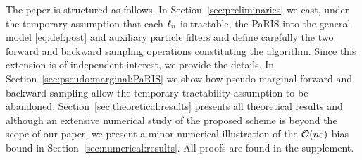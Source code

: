 The paper is structured as follows. In Section~\ref{sec:preliminaries} we cast, under the temporary assumption that each $\ell_{n}$ is tractable, the PaRIS into the general model \eqref{eq:def:post} and auxiliary particle filters and define carefully the two forward and backward sampling operations constituting the algorithm. Since this extension is of independent interest, we provide the details. In Section~\ref{sec:pseudo:marginal:PaRIS} we show how pseudo-marginal forward and backward sampling allow the temporary tractability assumption to be abandoned. Section~\ref{sec:theoretical:results} presents all theoretical results and although an extensive numerical study of the proposed scheme is beyond the scope of our paper, we present a minor numerical illustration of the $\mathcal{O}(n \varepsilon)$ bias bound in Section~\ref{sec:numerical:results}. All proofs are found in the supplement. 


 
